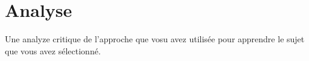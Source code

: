 \documentclass{article}
\begin{document}
\section{Analyse}

Une analyze critique de l'approche que vosu avez utilisée pour apprendre le sujet que vous avez sélectionné.




\end{document}
